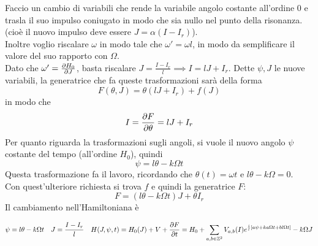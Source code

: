 \documentclass[a4paper,12pt]{article}
\theoremstyle{plain}
\theoremstyle{definition}
\newcommand{\f}[2]{\frac{#1}{#2}}
\theoremstyle{remark}
\begin{document}
Faccio un cambio di variabili che rende la variabile angolo costante all'ordine $0$ e trasla il suo impulso coniugato in modo che sia nullo nel punto della risonanza. (cioè il nuovo impulso deve essere $J=\alpha(I-I_r)$).
\\Inoltre voglio riscalare $\omega$ in modo tale che $\omega'=\omega l$, in modo da semplificare il valore del suo rapporto con $\Omega$.
\\Dato che $\omega'=\pdv{H_0}{J}$, basta riscalare $J=\f{I-I_r}{l}\implies I=lJ+I_r$. Dette $\psi,J $ le nuove variabili, la generatrice che fa queste trasformazioni sarà della forma
\[F(\theta,J)=\theta(lJ+I_r)+f(J)\]
in modo che \[I=\pdv{F}{\theta}=lJ+I_r\]
Per quanto riguarda la trasformazioni sugli angoli, si vuole il nuovo angolo $\psi$ costante del tempo (all'ordine $H_0$), quindi
\[\psi=l\theta-k \Omega t\]
Questa trasformazione fa il lavoro, ricordando che $\theta(t)=\omega t $ e $l\theta-k\Omega=0$.
\\Con quest'ulteriore richiesta si trova $f$ e quindi la generatrice $F$:
\[F=(l\theta-k\Omega t)J+\theta I_r			\]
Il cambiamento nell'Hamiltoniana è

\[\psi=l\theta-k\Omega t\quad J=\f{I-I_r}{l}\quad H(J,\psi,t)=H_0(J)+V+\pdv{F}{t}=H_0+\sum_{a,b\in\mathbb{Z}^2} V_{a,b}(I) e^{\f{i}{l}[a \psi+k a\Omega t+b l\Omega t]}-k\Omega J		\]
\end{document}
